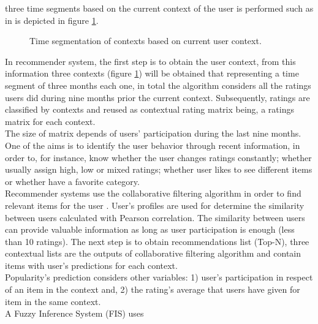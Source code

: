 three time segments based on the current context of the user is
performed such as in is depicted in figure \ref{fig:context-ml}.
\begin{figure}
\captionsetup{justification=centering,margin=2cm,font=footnotesize}
\centering
\setlength\fboxsep{0pt}
\caption{Time segmentation of contexts based on current user
context.}
\label{fig:context-ml}     
\end{figure}
In recommender system, the first step is to obtain the user context, 
from this information three contexts
(figure \ref{fig:context-ml}) will be obtained that representing a
time segment of three months each one, in total the algorithm
considers all the ratings users did during nine months prior the
current context. Subsequently, ratings are classified by contexts and
reused as contextual rating matrix being, a ratings matrix for each
context. \\The size of matrix depends of users' participation during
the last nine months. One of the aims is to identify the user behavior
through recent information, in order to, for instance, know whether
the user changes ratings constantly; whether usually assign high, low
or mixed ratings; whether user likes to see different items or whether
have a favorite category.\\  Recommender systems use the collaborative
filtering algorithm in order to find relevant items for the user
\cite{ramirez2013restaurant}. User's profiles are used for determine
the similarity between users calculated with Pearson correlation. The
similarity between users can provide valuable information as long as
user participation is enough (less than 10 ratings). The next step is
to obtain recommendations list (Top-N), three contextual lists are the
outputs of collaborative filtering algorithm and contain items with
user's predictions for each context.\\Popularity's prediction
considers other variables: 1) user’s participation in respect of an
item in the context and, 2) the rating's average that users have given
for item in the same context. \\A Fuzzy Inference System (FIS) uses
